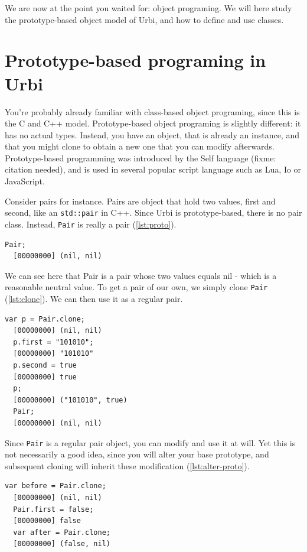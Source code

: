 \documentclass[openright,twoside,12pt]{report}
\newcommand{\C}{C\xspace}
\newcommand{\Cxx}{C++\xspace}
\newcommand{\io}{Io\xspace}
\newcommand{\js}{JavaScript\xspace}
\newcommand{\lua}{Lua}
\newcommand{\urbi}{Urbi\xspace}
\newcommand{\lst}[1]{\autoref{lst:#1}}
\begin{document}
We are now at the point you waited for: object programing. We will
here study the prototype-based object model of \urbi, and how to
define and use classes.

\section{Prototype-based programing in \urbi}

You're probably already familiar with class-based object programing,
since this is the \C and \Cxx model. Prototype-based object programing
is slightly different: it has no actual types. Instead, you have an
object, that is already an instance, and that you might clone to
obtain a new one that you can modify afterwards. Prototype-based
programming was introduced by the Self language (fixme: citation
needed), and is used in several popular script language such as \lua,
\io or \js.

Consider pairs for instance. Pairs are object that hold two values,
first and second, like an \texttt{std::pair} in \Cxx. Since \urbi is
prototype-based, there is no pair class. Instead, \lstinline|Pair| is
really a pair (\lst{proto}).

\begin{lstlisting}[caption=Prototypes in \urbi, label=lst:proto]
  Pair;
  [00000000] (nil, nil)
\end{lstlisting}

We can see here that Pair is a pair whose two values equals nil -
which is a reasonable neutral value. To get a pair of our own, we
simply clone \lstinline|Pair| (\lst{clone}). We can then use it as a
regular pair.

\begin{lstlisting}[caption=Cloning, label=lst:clone]
  var p = Pair.clone;
  [00000000] (nil, nil)
  p.first = "101010";
  [00000000] "101010"
  p.second = true
  [00000000] true
  p;
  [00000000] ("101010", true)
  Pair;
  [00000000] (nil, nil)
\end{lstlisting}

Since \lstinline|Pair| is a regular pair object, you can modify and
use it at will. Yet this is not necessarily a good idea, since you
will alter your base prototype, and subsequent cloning will inherit
these modification (\lst{alter-proto}).

\begin{lstlisting}[caption=Altering a prototype, label=lst:alter-proto]
  var before = Pair.clone;
  [00000000] (nil, nil)
  Pair.first = false;
  [00000000] false
  var after = Pair.clone;
  [00000000] (false, nil)
\end{lstlisting}
\end{document}
